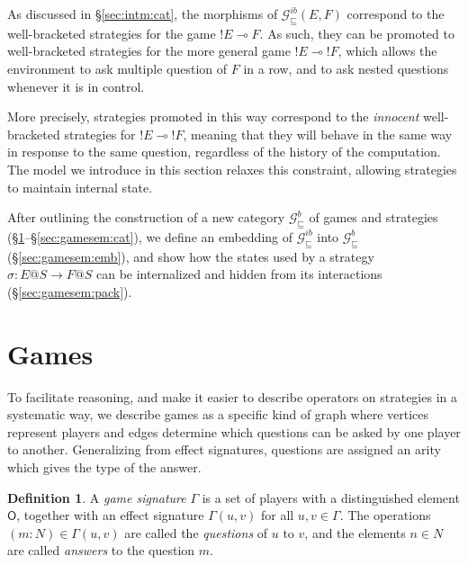 \documentclass[11pt,oneside,draft]{book}
\theoremstyle{definition}
\newtheorem{definition}[theorem]{Definition}
\newcommand{\gcat}{\mathcal{G}_{\sqsubseteq}}
\newcommand{\kw}[1]{\ensuremath{ \mathsf{#1} }}
\begin{document}
As discussed in \S\ref{sec:intm:cat},
the morphisms of $\gcat^{ib}(E, F)$
correspond to the well-bracketed strategies
for the game ${!E} \multimap F$.
As such, they can be promoted to well-bracketed strategies for
the more general game ${!E} \multimap {!F}$,
which allows the environment to ask
multiple question of $F$ in a row,
and to ask nested questions
whenever it is in control.

More precisely,
strategies promoted in this way
correspond to the \emph{innocent} well-bracketed strategies for
${!E} \multimap {!F}$,
meaning that they will behave in the same way
in response to the same question,
regardless of the history of the computation.
The model we introduce in this section
relaxes this constraint,
allowing strategies to maintain internal state.

After outlining the construction of a new category $\gcat^b$
of games and strategies
(\S\ref{sec:gamesem:games}--\S\ref{sec:gamesem:cat}),
we define an embedding of
$\gcat^{ib}$ into $\gcat^b$
(\S\ref{sec:gamesem:emb}),
and show how the states used by a strategy
$\sigma : E@S \rightarrow F@S$
can be internalized and
hidden from its interactions
(\S\ref{sec:gamesem:pack}).


\section{Games} \label{sec:gamesem:games} %

To facilitate reasoning,
and make it easier to describe operators on strategies
in a systematic way,
we describe games as a specific kind of graph
where vertices represent players
and edges determine which questions can be asked
by one player to another.
Generalizing from effect signatures,
questions are assigned an arity
which gives the type of the answer.

\begin{definition}
A \emph{game signature} $\Gamma$
is a set of players with a distinguished element $\kw{O}$,
together with an effect signature $\Gamma(u, v)$
for all $u, v \in \Gamma$.
The operations $(m \mathbin: N) \in \Gamma(u, v)$ are called
the \emph{questions} of $u$ to $v$,
and the elements $n \in N$ are called
\emph{answers} to the question $m$.
\end{definition}
\end{document}
